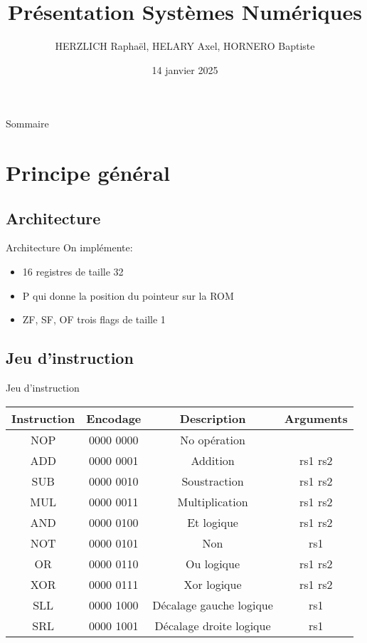 \documentclass{beamer}
\title{Présentation Systèmes Numériques}
\date{14 janvier 2025}
\author{HERZLICH Raphaël, HELARY Axel, HORNERO Baptiste}
\begin{document}
    \frame{\titlepage}

    \begin{frame}{Sommaire}
        \tableofcontents[hideallsubsections]
    \end{frame}


\section{Principe général}
    \begin{frame}
    \end{frame}

    \subsection{Architecture}
    \begin{frame}{Architecture}
        On implémente:
        \begin{itemize}
            \item 16 registres de taille 32
            \item P qui donne la position du pointeur sur la ROM
            \item ZF, SF, OF trois flags de taille 1
        \end{itemize}
    \end{frame}

    \subsection{Jeu d'instruction}
    \begin{frame}{Jeu d'instruction}

        \begin{tabular}{| c || c || c | c |}
            Instruction & Encodage & Description & Arguments\\ \hline
            NOP & 0000 0000 & No opération &\\ \hline
            ADD & 0000 0001 & Addition & rs1 rs2\\ \hline
            SUB & 0000 0010 & Soustraction & rs1 rs2 \\ \hline
            MUL & 0000 0011 & Multiplication & rs1 rs2 \\ \hline
            AND & 0000 0100 & Et logique & rs1 rs2\\ \hline
            NOT & 0000 0101 & Non & rs1\\ \hline
            OR  & 0000 0110 & Ou logique & rs1 rs2\\ \hline
            XOR & 0000 0111 & Xor logique & rs1 rs2\\ \hline
            SLL & 0000 1000 & Décalage gauche logique & rs1 \\ \hline
            SRL & 0000 1001 & Décalage droite logique & rs1\\ \hline
        \end{tabular}
    \end{frame}
\end{document}
